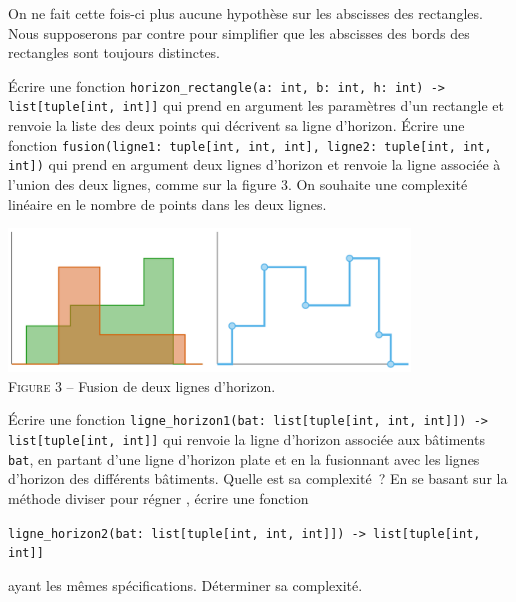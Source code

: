 \documentclass{magnolia}
\begin{document}
On ne fait cette fois-ci plus aucune hypothèse sur les abscisses des rectangles. Nous supposerons par contre
pour simplifier que les abscisses des bords des rectangles sont toujours distinctes.
\begin{questions}
\question Écrire une fonction \verb!horizon_rectangle(a: int, b: int, h: int) -> list[tuple[int, int]]! qui prend
  en argument les paramètres d'un rectangle et renvoie la liste des deux points qui décrivent sa ligne
  d'horizon.
\question Écrire une fonction \verb!fusion(ligne1: tuple[int, int, int], ligne2: tuple[int, int, int])! qui prend
  en argument deux lignes d'horizon et renvoie la ligne associée à l'union des deux lignes, comme sur la figure
  3. On souhaite une complexité linéaire en le nombre de points dans les deux lignes.
\begin{center}
\includegraphics[width=0.8\textwidth]{../../commun/images/python-tp-horizon-3}\\
\textsc{Figure 3} -- Fusion de deux lignes d'horizon.
\end{center}
\question Écrire une fonction \verb!ligne_horizon1(bat: list[tuple[int, int, int]]) -> list[tuple[int, int]]!
  qui renvoie la ligne d'horizon associée aux bâtiments \verb!bat!, en partant d'une ligne d'horizon
  plate et en la fusionnant avec les lignes d'horizon des différents bâtiments. Quelle est sa complexité~?
\question En se basant sur la méthode \og diviser pour régner \fg, écrire une fonction
\begin{center}
  \verb!ligne_horizon2(bat: list[tuple[int, int, int]]) -> list[tuple[int, int]]!
\end{center}
  ayant les mêmes spécifications. Déterminer sa complexité.

\end{questions}
\end{document}
